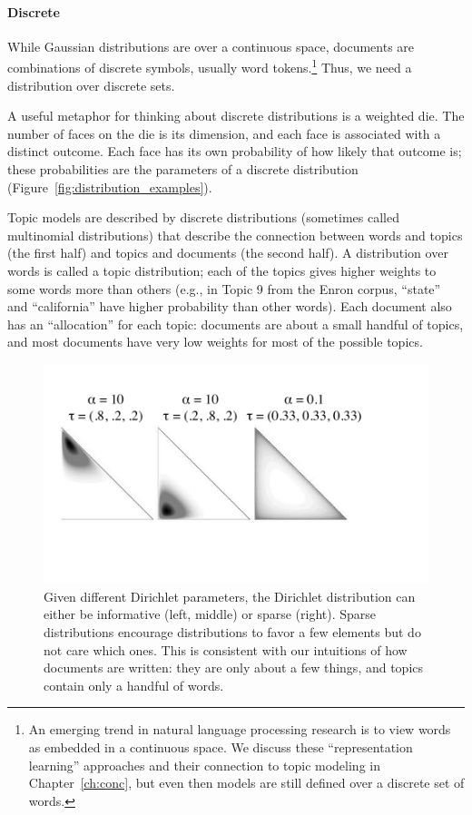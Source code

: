 \paragraph{Discrete}

While Gaussian distributions are over a continuous space, documents are
combinations of discrete symbols, usually word tokens.\footnote{An emerging trend in natural language
  processing research is to view words as embedded in a continuous space. We
  discuss these ``representation learning'' approaches and their connection to
  topic modeling in Chapter~\ref{ch:conc}, but even then models are still defined over a discrete set of words.}   Thus, we need a distribution
over discrete sets.

A useful metaphor for thinking about discrete distributions is a weighted die.
The number of faces on the die is its dimension, and each face is associated with a distinct
outcome.  Each face has its own probability of how likely that outcome is;
these probabilities are the parameters of a discrete distribution
(Figure~\ref{fig:distribution_examples}).

Topic models are described by discrete distributions (sometimes called
multinomial distributions) that describe the connection between words and topics (the first half) and topics and documents (the second half).  A distribution
over words is called a topic distribution; each of the topics gives
higher weights to some words more than others (e.g., in Topic 9 from
the Enron corpus, ``state'' and ``california'' have higher probability
than other words).  Each document also has an ``allocation'' for each
topic: documents are about a small handful of topics, and most
documents have very low weights for most of the possible topics.

\begin{center}
\begin{figure}
  \centering
  \includegraphics[width=.8\linewidth]{figures/dirichlet}
  \caption{Given different Dirichlet parameters, the Dirichlet
    distribution can either be informative (left, middle) or sparse
    (right).  Sparse distributions encourage distributions to favor
 a few elements but do not care which ones.  This
    is consistent with our intuitions of how documents are written:
    they are only about a few things, and topics contain only a
    handful of words.}
  \label{fig:dirichlet_sparsity}
\end{figure}
\end{center}

